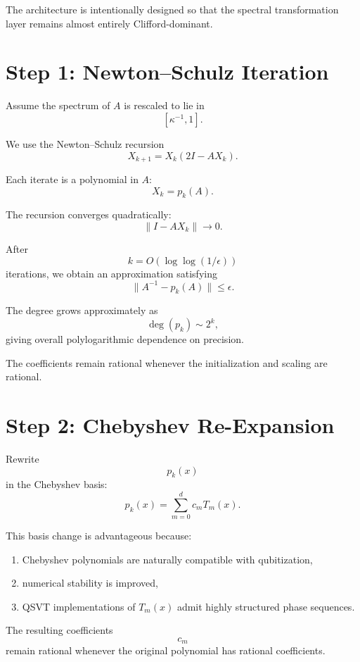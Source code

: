 \documentclass[12pt,a4paper]{article}
\begin{document}
The architecture is intentionally designed so that the spectral transformation layer remains almost entirely Clifford-dominant.


\section{Step 1: Newton--Schulz Iteration}

Assume the spectrum of $A$ is rescaled to lie in
\[
[\kappa^{-1},1].
\]

We use the Newton--Schulz recursion
\[
X_{k+1}
=
X_k(2I-AX_k).
\]

Each iterate is a polynomial in $A$:
\[
X_k = p_k(A).
\]

The recursion converges quadratically:
\[
\|I-AX_k\|
\rightarrow
0.
\]

After
\[
k = O(\log\log(1/\epsilon))
\]
iterations, we obtain an approximation satisfying
\[
\|A^{-1}-p_k(A)\|
\le
\epsilon.
\]

The degree grows approximately as
\[
\deg(p_k)\sim 2^k,
\]
giving overall polylogarithmic dependence on precision.

The coefficients remain rational whenever the initialization and scaling are rational.


\section{Step 2: Chebyshev Re-Expansion}

Rewrite
\[
p_k(x)
\]
in the Chebyshev basis:
\[
p_k(x)
=
\sum_{m=0}^d c_m T_m(x).
\]

This basis change is advantageous because:

\begin{enumerate}
    \item Chebyshev polynomials are naturally compatible with qubitization,
    \item numerical stability is improved,
    \item QSVT implementations of $T_m(x)$ admit highly structured phase sequences.
\end{enumerate}

The resulting coefficients
\[
c_m
\]
remain rational whenever the original polynomial has rational coefficients.

\end{document}
